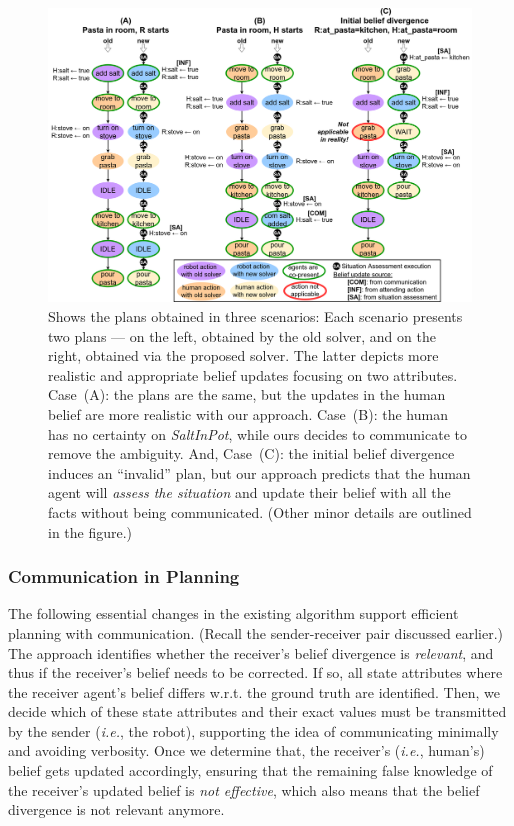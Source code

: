 \documentclass[letterpaper]{article} %
\begin{document}
\begin{figure}[!ht]
    \centering
    \includegraphics[width=0.78\linewidth]{figures/example_cook.png}
    \caption{
    Shows the plans obtained in three scenarios: Each scenario presents two plans --- on the left, obtained by the old solver, and on the right, obtained via the proposed solver. The latter depicts more realistic and appropriate belief updates focusing on two attributes.
    Case~(A): the plans are the same, but the updates in the human belief are more realistic with our approach. Case~(B): the human has no certainty on {\em SaltInPot}, while ours decides to communicate to remove the ambiguity. And, Case~(C): the initial belief divergence induces an ``invalid'' plan, but our approach predicts that the human agent will \textit{assess the situation} and update their belief with all the facts without being communicated. (Other minor details are outlined in the figure.)
    }
    \label{fig:scenarios}
\end{figure}

\subsubsection{Communication in Planning}
The following essential changes in the existing algorithm support efficient planning with communication.
(Recall the sender-receiver pair discussed earlier.) The approach identifies whether the receiver's belief divergence is \textit{relevant}, and thus if the receiver's belief needs to be corrected.
If so, all state attributes where the receiver agent's belief differs w.r.t. the ground truth are identified. Then, we decide which of these state attributes and their exact values must be transmitted by the sender (\textit{i.e.}, the robot), supporting the idea of communicating minimally and avoiding verbosity. Once we determine that, the receiver's (\textit{i.e.}, human's) belief gets updated accordingly, ensuring that the remaining false knowledge of the receiver's updated belief is \textit{not effective}, which also means that the belief divergence is not relevant anymore. 
    
\end{document}
